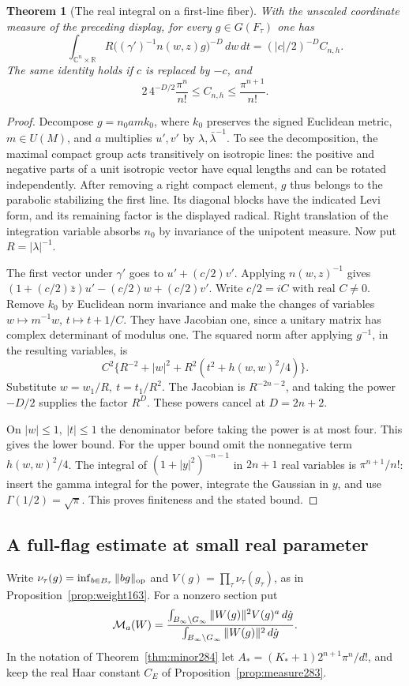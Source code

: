 \documentclass[a4paper,11pt]{article}
\newtheorem{theorem}[proposition]{Theorem}
\theoremstyle{definition}
\theoremstyle{remark}
\newcommand{\RR}{\mathbb R}\newcommand{\CC}{\mathbb C}\newcommand{\QQ}{\mathbb Q}
\numberwithin{equation}{section}
\begin{document}
\begin{theorem}[The real integral on a first-line fiber]\leavevmode
\label{thm:fiber283}
With the unscaled coordinate measure of the preceding
display, for every \(g\in G(F_\tau)\) one has
\[
 \int_{\CC^n\times\RR}
       R\bigl((\gamma')^{-1}n(w,z)g\bigr)^{-D}\,dw\,dt
                 = (|c|/2)^{-D} C_{n,h}.
\]
The same identity holds if \(c\) is replaced by \(-c\), and
\[
      2\,4^{-D/2}\frac{\pi^n}{n!}
             \le C_{n,h}\le\frac{\pi^{n+1}}{n!}.
\]
\end{theorem}
\begin{proof}
Decompose \(g=n_0 a m k_0\), where \(k_0\) preserves the
signed Euclidean metric, \(m\in U(M)\), and \(a\) multiplies
\(u',v'\) by \(\lambda,\bar\lambda^{-1}\). To see the
decomposition, the maximal compact group acts transitively
on isotropic lines: the positive and negative parts of a
unit isotropic vector have equal lengths and can be rotated
independently. After removing a right compact element, \(g\)
thus belongs to the parabolic stabilizing the first line.
Its diagonal blocks have the indicated Levi form, and its
remaining factor is the displayed radical. Right translation
of the integration variable absorbs \(n_0\) by invariance
of the unipotent measure. Now put \(R=|\lambda|^{-1}\).

The first vector under \(\gamma'\) goes to
\(u'+(c/2)v'\). Applying \(n(w,z)^{-1}\) gives
\((1+(c/2)\bar z)u'-(c/2)w+(c/2)v'\).
Write \(c/2=iC\) with real \(C\ne0\). Remove \(k_0\) by
Euclidean norm invariance and make the changes of variables
\(w\mapsto m^{-1}w\), \(t\mapsto t+1/C\).
They have Jacobian one, since a unitary matrix has complex
determinant of modulus one. The squared norm after applying
\(g^{-1}\), in the resulting variables, is
\[
  C^2\{R^{-2}+|w|^2+R^2(t^2+h(w,w)^2/4)\}.
\]
Substitute \(w=w_1/R,\ t=t_1/R^2\). The Jacobian is
\(R^{-2n-2}\), and taking the power \(-D/2\) supplies the
factor \(R^D\). These powers cancel at \(D=2n+2\).

On \(|w|\le1,\ |t|\le1\) the denominator before taking
the power is at most four. This gives the lower bound.
For the upper bound omit the nonnegative term \(h(w,w)^2/4\).
The integral of \((1+|y|^2)^{-n-1}\) in \(2n+1\) real
variables is \(\pi^{n+1}/n!\): insert the gamma integral
for the power, integrate the Gaussian in \(y\), and use
\(\Gamma(1/2)=\sqrt\pi\). This proves finiteness and the
stated bound.
\end{proof}

\subsection{A full-flag estimate at small real parameter}\label{nav:VII-52}
Write \(\nu_\tau(g)=\inf_{b\in B_\tau}\|bg\|_{\rm op}\)
and \(V(g)=\prod_\tau\nu_\tau(g_\tau)\), as in
Proposition~\ref{prop:weight163}. For a nonzero section put
\[
 {\cal M}_a(W)=
 \frac{\int_{B_\infty\backslash G_\infty}\|W(g)\|^2
                         V(g)^a\,d\dot g}
      {\int_{B_\infty\backslash G_\infty}\|W(g)\|^2\,d\dot g}.
\]
In the notation of Theorem~\ref{thm:minor284} let
\(A_*=(K_*+1)2^{n+1}\pi^n/d!\), and keep the real Haar
constant \(C_E\) of Proposition~\ref{prop:measure283}.
\end{document}
